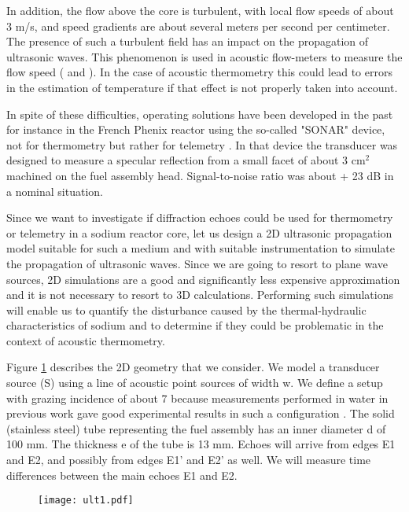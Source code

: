         In addition, the flow above the core is turbulent, with local flow speeds of about 3 m/s, and speed gradients are about several meters per second per
centimeter. The presence of such a turbulent field has an impact on the propagation of ultrasonic waves. This phenomenon is used in acoustic flow-meters to
measure the flow speed (\cite{Liu2011Thecalculationof} and \cite{Weber2004Ultrasonicbeampropagation}). In the case of acoustic thermometry this could lead to
errors in the estimation of temperature if that effect is not properly taken into account.

        In spite of these difficulties, operating solutions have been developed in the past for instance in the French Phenix reactor using the so-called
"SONAR" device, not for thermometry but rather for telemetry \parencite{Berton1996Continuousmonitoringof}. In that device the transducer was designed to
measure a specular reflection from a small facet of about 3 $\text{cm}^2$ machined on the fuel assembly head. Signal-to-noise ratio was about + 23 dB in a
nominal situation.

        Since we want to investigate if diffraction echoes could be used for thermometry or telemetry in a sodium reactor core, let us design a 2D ultrasonic
propagation model suitable for such a medium and with suitable instrumentation to simulate the propagation of ultrasonic waves. Since we are going to resort to
plane wave sources, 2D simulations are a good and significantly less expensive approximation and it is not necessary to resort to 3D calculations. Performing
such simulations will enable us to quantify the disturbance caused by the thermal-hydraulic characteristics of sodium and to determine if they could be
problematic in the context of acoustic thermometry.

        Figure \ref{fig:ult1} describes the 2D geometry that we consider. We model a transducer source (S) using a line of acoustic point sources of width w. We
define a setup with grazing incidence of about 7\textdegree{} because measurements performed in water in previous work gave good experimental results in such a
configuration \parencite{Tenchine2010Somethermalhydraulic}. The solid (stainless steel) tube representing the fuel assembly has an inner diameter d of 100 mm.
The thickness e of the tube is 13 mm. Echoes will arrive from edges E1 and E2, and possibly from edges E1' and E2' as well. We will measure time differences
between the main echoes E1 and E2.
        \begin{figure}[htbp]
            \centerline{\texttt{[image: ult1.pdf]}}
            \label{fig:ult1}
        \end{figure}


